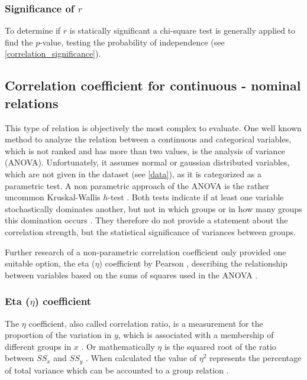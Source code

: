 \subsubsection{Significance of $r$}
To determine if $r$ is statically significant a chi-square test is generally applied to find the $p$-value, testing the probability of independence (see \cref{correlation_significance}). 

\subsection{Correlation coefficient for continuous - nominal relations}
This type of relation is objectively the most complex to evaluate. One well known method to analyze the relation between a continuous and categorical variables, which is not ranked and has more than two values, is the analysis of variance (ANOVA). Unfortunately, it assumes normal or gaussian distributed variables, which are not given in the dataset (see \cref{data}), as it is categorized as a parametric test. A non parametric approach of the ANOVA is the rather uncommon Kruskal-Wallis $h$-test \parencite{Leon1998}. Both tests indicate if at least one variable stochastically dominates another, but not in which groups or in how many groups this domination occurs \parencite{OTSD2020}. They therefore do not provide a statement about the correlation strength, but the statistical significance of variances between groups.

Further research of a non-parametric correlation coefficient only provided one suitable option, the eta ($\eta$) coefficient by Pearson \parencite{Benninghaus2007}, describing the relationship between variables based on the sums of squares used in the ANOVA \parencite{Lewis2012,Benninghaus2007}.

\subsubsection{Eta ($\eta$) coefficient}
The $\eta$ coefficient, also called correlation ratio, is a measurement for the proportion of the variation in $y$, which is associated with a membership of different groups in $x$ \parencite{Laken2013}. Or mathematically $\eta$ is the squared root of the ratio between $SS_x$ and $SS_y$ \parencite{Shaldehi2013,SAGE2014}. When calculated the value of $\eta^2$ represents the percentage of total variance which can be accounted to a group relation \parencite{Laken2013}.

